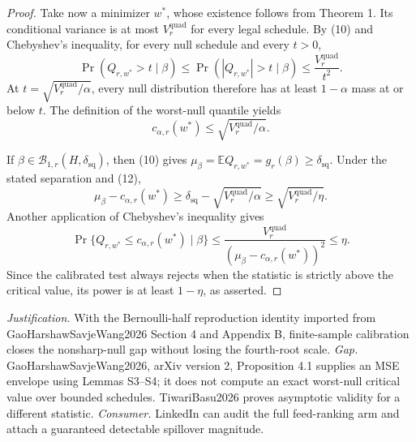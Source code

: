 \documentclass{article}
\begin{document}
\begin{proof}
Take now a minimizer \(w^*\), whose existence follows from Theorem 1.  Its conditional variance is at most \(V_r^{\mathrm{quad}}\) for every legal schedule.  By (10) and Chebyshev's inequality, for every null schedule and every \(t>0\),
\[
\Pr(Q_{r,w^*}>t\mid\beta)
\le\Pr(|Q_{r,w^*}|>t\mid\beta)
\le\frac{V_r^{\mathrm{quad}}}{t^2}.
\]
At \(t=\sqrt{V_r^{\mathrm{quad}}/\alpha}\), every null distribution therefore has at least \(1-\alpha\) mass at or below \(t\).  The definition of the worst-null quantile yields
\[
c_{\alpha,r}(w^*)\le\sqrt{V_r^{\mathrm{quad}}/\alpha}. \tag{12}
\]

If \(\beta\in\mathcal B_{1,r}(H,\delta_{\mathrm{sq}})\), then (10) gives \(\mu_\beta=\mathbb E Q_{r,w^*}=g_r(\beta)\ge\delta_{\mathrm{sq}}\).  Under the stated separation and (12),
\[
\mu_\beta-c_{\alpha,r}(w^*)
\ge\delta_{\mathrm{sq}}-\sqrt{V_r^{\mathrm{quad}}/\alpha}
\ge\sqrt{V_r^{\mathrm{quad}}/\eta}.
\]
Another application of Chebyshev's inequality gives
\[
\Pr\{Q_{r,w^*}\le c_{\alpha,r}(w^*)\mid\beta\}
\le\frac{V_r^{\mathrm{quad}}}{(\mu_\beta-c_{\alpha,r}(w^*))^2}\le\eta.
\]
Since the calibrated test always rejects when the statistic is strictly above the critical value, its power is at least \(1-\eta\), as asserted.
\end{proof}
\par\smallskip\noindent \textit{Justification.} With the Bernoulli-half reproduction identity imported from GaoHarshawSavjeWang2026 Section 4 and Appendix B, finite-sample calibration closes the nonsharp-null gap without losing the fourth-root scale. \textit{Gap.} GaoHarshawSavjeWang2026, arXiv version 2, Proposition 4.1 supplies an MSE envelope using Lemmas S3--S4; it does not compute an exact worst-null critical value over bounded schedules. TiwariBasu2026 proves asymptotic validity for a different statistic. \textit{Consumer.} LinkedIn can audit the full feed-ranking arm and attach a guaranteed detectable spillover magnitude.
\end{document}
